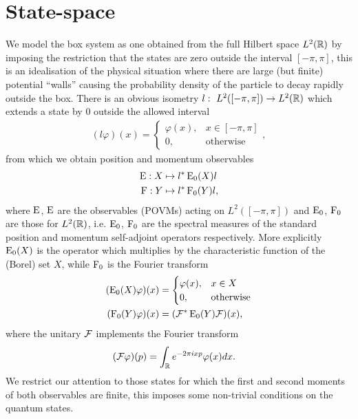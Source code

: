 \section{State-space}\label{sec:box-ur-state-space}
We model the box system as one obtained from the full Hilbert space $L^2(\mathbb{R})$ by imposing the restriction that the states are zero outside the interval $[-\pi, \pi]$, this is an idealisation of the physical situation where there are large (but finite) potential ``walls'' causing the probability density of the particle to decay rapidly outside the box. There is an obvious isometry $l:~L^2([-\pi,\pi])\to L^2(\mathbb{R})$ which extends a state by $0$ outside the allowed interval
\begin{align}
  (l\varphi)(x) = \begin{cases}\varphi(x), &x\in [-\pi,\pi]\\ 0, &\text{otherwise}\end{cases},
\end{align}
from which we obtain position and momentum observables 
\begin{align}
  \operatorname{E}:X &\mapsto l^* \operatorname{E}_0(X) l\\
  \operatorname{F}:Y &\mapsto l^* \operatorname{F}_0(Y) l,
\end{align}
where $\operatorname{E}$, $\operatorname{E}$ are the observables (POVMs) acting on $L^2([-\pi,\pi])$ and $\operatorname{E}_0$, $\operatorname{F}_0$ are those for $L^2(\mathbb{R})$, i.e. $\operatorname{E}_0$, $\operatorname{F}_0$ are the spectral measures of the standard position and momentum self-adjoint operators respectively. More explicitly $\operatorname{E}_0(X)$ is the operator which multiplies by the characteristic function of the (Borel) set $X$, while $\operatorname{F}_0$ is the Fourier transform
\begin{align}
  (\operatorname{E}_0(X)\varphi)(x) &= \begin{cases}\varphi(x), &x\in X\\ 0, &\text{otherwise}\end{cases}\\
  (\operatorname{F}_0(Y)\varphi)(x) &= (\mathcal{F}^*\operatorname{E}_0(Y)\mathcal{F})(x),
\end{align}
where the unitary $\mathcal{F}$ implements the Fourier transform
\begin{align}
  (\mathcal{F}\varphi)(p) &= \int_{\mathbb{R}} e^{-2\pi i x p} \varphi(x)dx.
\end{align}
We restrict our attention to those states for which the first and second moments of both observables are finite, this imposes some non-trivial conditions on the quantum states. 

